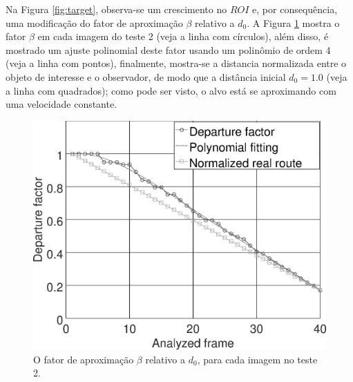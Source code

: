 Na Figura \ref{fig:target}, observa-se um crescimento no $ROI$ e, por
consequência, uma modificação do fator de aproximação $\beta$ relativo a $d_0$.
A Figura \ref{fig:res_grapha_b} mostra o fator $\beta$ em cada imagem 
do teste 2 (veja a linha com círculos),
além disso, é mostrado um ajuste polinomial deste fator usando 
um polinômio de ordem 4 (veja a linha com pontos),
finalmente, mostra-se a distancia normalizada entre o objeto de interesse e o observador,
de modo que a distância inicial $d_0=1.0$ (veja a linha com quadrados);
como pode ser visto, o alvo está se aproximando com uma velocidade constante.
\begin{figure}[H]
\includegraphics[width=\columnwidth]{images/grapha_b.eps}
\caption{O fator de aproximação $\beta$ relativo a $d_0$, para cada imagem no teste 2.}
\label{fig:res_grapha_b}
\end{figure}


